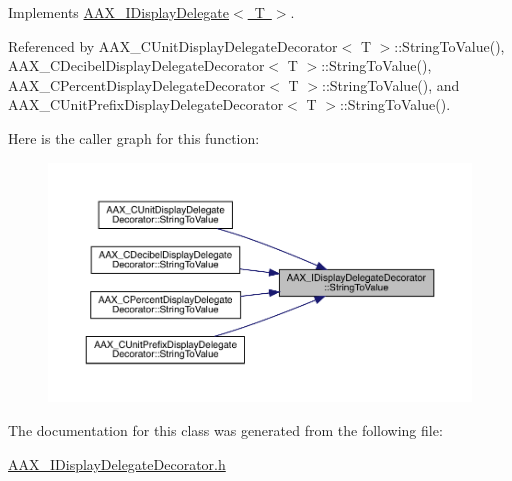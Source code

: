 Implements \mbox{\hyperlink{a01801_aed5224775c9f733f091afddfba057d5e}{A\+A\+X\+\_\+\+I\+Display\+Delegate$<$ T $>$}}.



Referenced by A\+A\+X\+\_\+\+C\+Unit\+Display\+Delegate\+Decorator$<$ T $>$\+::\+String\+To\+Value(), A\+A\+X\+\_\+\+C\+Decibel\+Display\+Delegate\+Decorator$<$ T $>$\+::\+String\+To\+Value(), A\+A\+X\+\_\+\+C\+Percent\+Display\+Delegate\+Decorator$<$ T $>$\+::\+String\+To\+Value(), and A\+A\+X\+\_\+\+C\+Unit\+Prefix\+Display\+Delegate\+Decorator$<$ T $>$\+::\+String\+To\+Value().

Here is the caller graph for this function\+:
\nopagebreak
\begin{figure}[H]
\begin{center}
\leavevmode
\includegraphics[width=350pt]{a01805_a18d19293f3eca619cb5bb7f1ffde1a8d_icgraph}
\end{center}
\end{figure}


The documentation for this class was generated from the following file\+:\begin{DoxyCompactItemize}
\item 
\mbox{\hyperlink{a00584}{A\+A\+X\+\_\+\+I\+Display\+Delegate\+Decorator.\+h}}\end{DoxyCompactItemize}
